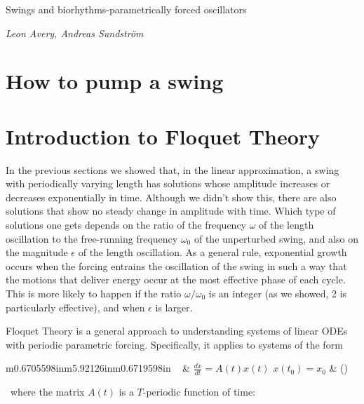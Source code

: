\documentclass[letterpaper]{article}
\title{}
\author{Leon Avery}
\date{2016-11-19}
\makeatletter
\newcommand\arraybslash{\let\\\@arraycr}
\newcounter{EquationNumber}
\renewcommand\theEquationNumber{\arabic{EquationNumber}}
\makeatother
\begin{document}
\clearpage\setcounter{page}{1}\pagestyle{Standard}
{\color[rgb]{0.09019608,0.21176471,0.3647059}
Swings and biorhythms\nobreakdash-parametrically forced oscillators}

{\itshape\color[rgb]{0.30980393,0.5058824,0.7411765}
Leon Avery, Andreas Sundström}

\section{How to pump a swing}
\section{Introduction to Floquet Theory}
In the previous sections we showed that, in the linear approximation,
a swing with periodically varying length has solutions whose
amplitude increases or decreases exponentially in time. Although we
didn’t show this, there are also solutions that show no steady change
in amplitude with time. Which type of solutions one gets depends on
the ratio of the frequency  $\omega $ of the length oscillation to
the free-running frequency  ${\omega }_{0}$ of the unperturbed swing,
and also on the magnitude  $\epsilon $ of the length oscillation. As
a general rule, exponential growth occurs when the forcing entrains
the oscillation of the swing in such a way that the motions that
deliver energy occur at the most effective phase of each cycle. This
is more likely to happen if the ratio  $\omega /{\omega }_{0}$ is an
integer (as we showed, 2 is particularly effective), and when 
$\epsilon $ is larger. 

Floquet Theory is a general approach to understanding systems of
linear ODEs with periodic parametric forcing. Specifically, it
applies to systems of the form 


\bigskip

\begin{flushleft}
\tablehead{}
\begin{supertabular}{m{0.6705598in}m{5.92126in}m{0.6719598in}}
~
 &
\centering  $\frac{dx}{\mathit{dt}}=A\left(t\right)x\left(t\right)$
$x\left({t}_{0}\right)={x}_{0}$ &
\raggedleft\arraybslash
(\label{bkm:floquetsys}\stepcounter{EquationNumber}{\theEquationNumber})\\
\end{supertabular}
\end{flushleft}

\bigskip

\ where the matrix  $A(t)$ is a  $T${}-periodic function of time:
\end{document}
